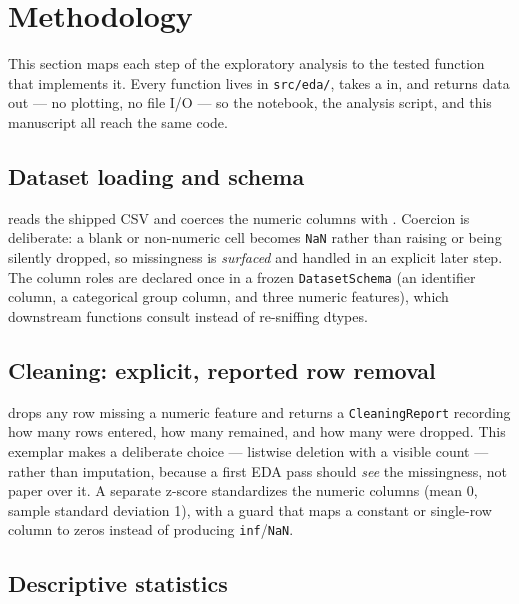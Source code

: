 \documentclass[
  english,
]{article}
\begin{document}
\newpage

\section{Methodology}\label{sec:methodology}

This section maps each step of the exploratory analysis to the tested
function that implements it. Every function lives in \texttt{src/eda/},
takes a  in, and returns data out --- no
plotting, no file I/O --- so the notebook, the analysis script, and this
manuscript all reach the same code.

\subsection{Dataset loading and
schema}\label{dataset-loading-and-schema}

 reads the shipped CSV and
coerces the numeric columns with
. Coercion is deliberate: a
blank or non-numeric cell becomes \texttt{NaN} rather than raising or
being silently dropped, so missingness is \emph{surfaced} and handled in
an explicit later step. The column roles are declared once in a frozen
\texttt{DatasetSchema} (an identifier column, a categorical group
column, and three numeric features), which downstream functions consult
instead of re-sniffing dtypes.

\subsection{Cleaning: explicit, reported row
removal}\label{cleaning-explicit-reported-row-removal}

 drops any row missing a
numeric feature and returns a \texttt{CleaningReport} recording how many
rows entered, how many remained, and how many were dropped. This
exemplar makes a deliberate choice --- listwise deletion with a visible
count --- rather than imputation, because a first EDA pass should
\emph{see} the missingness, not paper over it. A separate
 z-score standardizes the numeric columns
(mean 0, sample standard deviation 1), with a guard that maps a constant
or single-row column to zeros instead of producing
\texttt{inf}/\texttt{NaN}.

\subsection{Descriptive statistics}\label{descriptive-statistics}
\end{document}

